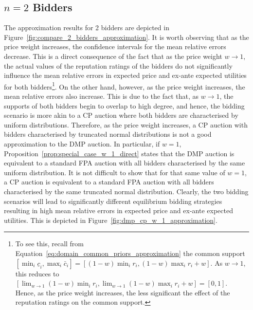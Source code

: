 \subsection{$n=2$ Bidders} %
\label{sub:n_2_bidders_approximation}
The approximation results for 2 bidders are depicted in Figure~\ref{fig:compare_2_bidders_approximation}. It is worth observing that as the price weight increases, the confidence intervals for the mean relative errors decrease. This is a direct consequence of the fact that as the price weight $w\to 1$, the actual values of the reputation ratings of the bidders do not significantly influence the mean relative errors in expected price and ex-ante expected utilities for both bidders\footnote{To see this, recall from Equation~\eqref{eq:domain_common_priors_approximation} the common support $[\min_i{\underline{c}_i}, \max_i{\bar{c}_i}]=[(1-w)\min_i{r_i}, (1-w)\max_i{r_i} + w]$. As $w\to 1$, this reduces to $[\lim_{w\to 1}(1-w)\min_i{r_i}, \lim_{w\to 1}(1-w)\max_i{r_i} + w] = [0,1]$. Hence, as the price weight increases, the less significant the effect of the reputation ratings on the common support.}. On the other hand, however, as the price weight increases, the mean relative errors also increase. This is due to the fact that, as $w\to 1$, the supports of both bidders begin to overlap to high degree, and hence, the bidding scenario is more akin to a CP auction where both bidders are characterised by uniform distributions. Therefore, as the price weight increases, a CP auction with bidders characterised by truncated normal distributions is not a good approximation to the DMP auction. In particular, if $w=1$, Proposition~\ref{prop:special_case_w_1_direct} states that the DMP auction is equivalent to a standard FPA auction with all bidders characterised by the same uniform distribution. It is not difficult to show that for that same value of $w=1$, a CP auction is equivalent to a standard FPA auction with all bidders characterised by the same truncated normal distribution. Clearly, the two bidding scenarios will lead to significantly different equilibrium bidding strategies resulting in high mean relative errors in expected price and ex-ante expected utilities. This is depicted in Figure~\ref{fig:dmp_cp_w_1_approximation}.

